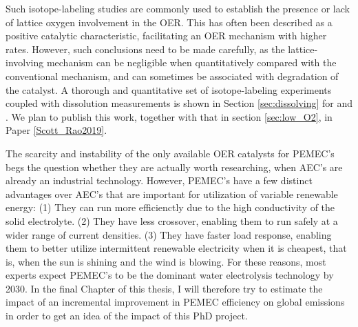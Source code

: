 Such isotope-labeling studies are commonly used to establish the presence or lack of lattice oxygen involvement in the OER. This has often been described as a positive catalytic characteristic, facilitating an OER mechanism with higher rates\cite{Grimaud2017, Geiger2018}. However, such conclusions need to be made carefully, as the lattice-involving mechanism can be negligible when quantitatively compared with the conventional mechanism, and can sometimes be associated with degradation of the catalyst. A thorough and quantitative set of isotope-labeling experiments coupled with dissolution measurements is shown in Section \ref{sec:dissolving} for  and . We plan to publish this work, together with that in section \ref{sec:low_O2}, in Paper \ref{Scott_Rao2019}.


The scarcity and instability of the only available OER catalysts for PEMEC's begs the question whether they are actually worth researching, when AEC's are already an industrial technology. However, PEMEC's have a few distinct advantages over AEC's that are important for utilization of variable renewable energy\cite{Carmo2013}: (1) They can run more efficienctly due to the high conductivity of the solid electrolyte. (2) They have less  crossover, enabling them to run safely at a wider range of current densities. (3) They have faster load response, enabling them to better utilize intermittent renewable electricity when it is cheapest, that is, when the sun is shining and the wind is blowing. For these reasons, most experts expect PEMEC's to be the dominant water electrolysis technology by 2030\cite{Schmidt2017}. In the final Chapter of this thesis, I will therefore try to estimate the impact of an incremental improvement in PEMEC efficiency on global  emissions in order to get an idea of the impact of this PhD project.